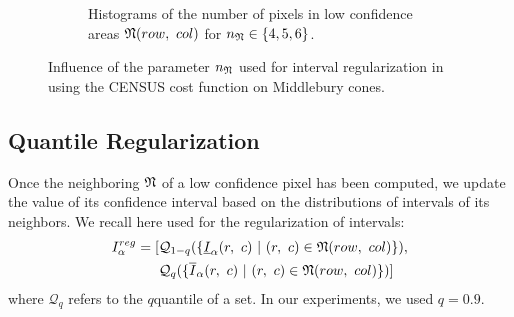 \begin{figure}
\begin{subfigure}[t]{0.7\linewidth}
        \caption{Histograms of the number of pixels in low confidence areas $\mathfrak{N}(row, ~col)$ for $n_{\mathfrak{N}}\in\{4,5,6\}$.} 
        \label{fig:ablation_study_n_N_hist_2}
    \end{subfigure}
    \caption{Influence of the parameter $n_{\mathfrak{N}}$ used for interval regularization in  using the CENSUS cost function on Middlebury cones.}
    \label{fig:ablation_study_n_N}
\end{figure}

\subsection{Quantile Regularization}
Once the neighboring $\mathfrak{N}$ of a low confidence pixel has been computed, we update the value of its confidence interval based on the distributions of intervals of its neighbors. We recall here  used for the regularization of intervals:
\begin{align*}
    I^{reg}_\alpha=[&\mathcal{Q}_{1-q}(\{\underline{I}_\alpha(r,~c)~|~(r,~c)\in\mathfrak{N}(row, ~col)\}),\nonumber\\
    &\mathcal{Q}_q(\{\overline{I}_\alpha(r,~c)~|~(r,~c)\in\mathfrak{N}(row, ~col)\})]
\end{align*}
where $\mathcal{Q}_q$ refers to the $q$\ith quantile of a set. In our experiments, we used $q=0.9$.

